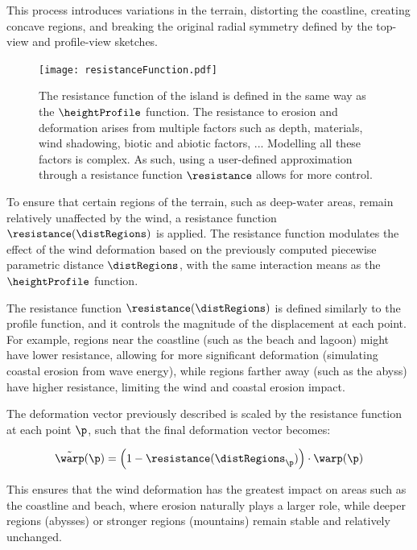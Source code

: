 This process introduces variations in the terrain, distorting the coastline, creating concave regions, and breaking the original radial symmetry defined by the top-view and profile-view sketches.


\begin{figure}[H]
\centering
\texttt{[image: resistanceFunction.pdf]}
\caption{The resistance function of the island is defined in the same way as the $\heightProfile$ function. The resistance to erosion and deformation arises from multiple factors such as depth, materials, wind shadowing, biotic and abiotic factors, ... Modelling all these factors is complex. As such, using a user-defined approximation through a resistance function $\resistance$ allows for more control.}
\label{fig:coral-island-resistance-function}
\end{figure}

To ensure that certain regions of the terrain, such as deep-water areas, remain relatively unaffected by the wind, a resistance function $\resistance(\distRegions)$ is applied. The resistance function modulates the effect of the wind deformation based on the previously computed piecewise parametric distance $\distRegions$, with the same interaction means as the $\heightProfile$ function.

The resistance function $\resistance(\distRegions)$ is defined similarly to the profile function, and it controls the magnitude of the displacement at each point. For example, regions near the coastline (such as the beach and lagoon) might have lower resistance, allowing for more significant deformation (simulating coastal erosion from wave energy), while regions farther away (such as the abyss) have higher resistance, limiting the wind and coastal erosion impact.

The deformation vector previously described is scaled by the resistance function at each point $\p$, such that the final deformation vector becomes:

\begin{align}
\Tilde{\warp}(\p) = \left(1 - \resistance(\distRegions_\p) \right) \cdot \warp(\p)
\end{align}

This ensures that the wind deformation has the greatest impact on areas such as the coastline and beach, where erosion naturally plays a larger role, while deeper regions (abysses) or stronger regions (mountains) remain stable and relatively unchanged.

